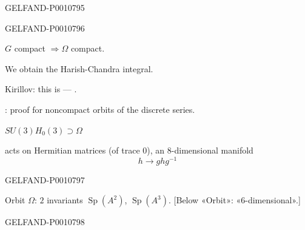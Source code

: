 \begin{GelfandAdjacentEvidence}{GELFAND-P001079}{5}

\end{GelfandAdjacentEvidence}
\begin{GelfandAdjacentEvidence}{GELFAND-P001079}{6}


$G$ compact $\Rightarrow\Omega$ compact.

We obtain the Harish-Chandra integral.

Kirillov: this is — .

: proof for noncompact orbits of the discrete series.


$SU(3)$\qquad $H_0(3)\supset\Omega$

acts on Hermitian matrices (of trace $0$), an $8$-dimensional manifold
\[
h\longrightarrow ghg^{-1}
\]
\end{GelfandAdjacentEvidence}
\begin{GelfandAdjacentEvidence}{GELFAND-P001079}{7}


Orbit $\Omega$: $2$ invariants $\operatorname{Sp}(A^2)$, $\operatorname{Sp}(A^3)$.
[Below «Orbit»: «6-dimensional».]
\end{GelfandAdjacentEvidence}
\begin{GelfandAdjacentEvidence}{GELFAND-P001079}{8}

\end{GelfandAdjacentEvidence}
